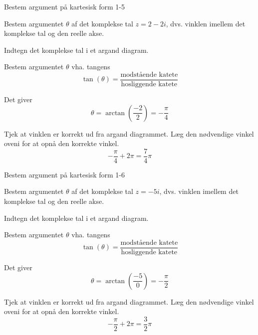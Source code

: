 \documentclass{article}
\begin{document}
\begin{exercise}{Bestem argument på kartesisk form 1-5}
	
	Bestem argumentet $\theta$ af det komplekse tal $z=2-2i$, dvs. vinklen imellem det komplekse tal og den reelle akse.
	
	
	
	\hint 
	
	Indtegn det komplekse tal i et argand diagram.
	
	
	\hint
	
	Bestem argumentet $\theta$ vha. tangens
	\[
	\tan(\theta)=\frac{\textrm{modstående katete}}{\textrm{hosliggende katete}}
	\]
	
	\hint 
	
	Det giver
	\[
	\theta = \arctan \left(\frac{-2}{2}\right) =- \frac{\pi}{4}
	\]
	
	\hint
	
	Tjek at vinklen er korrekt ud fra argand diagrammet. Læg den nødvendige vinkel oveni for at opnå den korrekte vinkel. 
	\[
	- \frac{\pi}{4} + 2 \pi = \frac{7}{4} \pi
	\]
	
\end{exercise}

\newpage

\begin{exercise}{Bestem argument på kartesisk form 1-6}
	
	Bestem argumentet $\theta$ af det komplekse tal $z=-5i$, dvs. vinklen imellem det komplekse tal og den reelle akse.
	
	
	
	\hint 
	
	Indtegn det komplekse tal i et argand diagram.
	
	
	\hint
	
	Bestem argumentet $\theta$ vha. tangens
	\[
	\tan(\theta)=\frac{\textrm{modstående katete}}{\textrm{hosliggende katete}}
	\]
	
	\hint 
	
	Det giver
	\[
	\theta = \arctan \left(\frac{-5}{0}\right) = - \frac{\pi}{2}
	\]
	
	\hint
	
	Tjek at vinklen er korrekt ud fra argand diagrammet. Læg den nødvendige vinkel oveni for at opnå den korrekte vinkel. 
	\[
	- \frac{\pi}{2} + 2 \pi  = \frac{3}{2} \pi  	
	\]
	
	
\end{exercise}

\newpage
\end{document}
